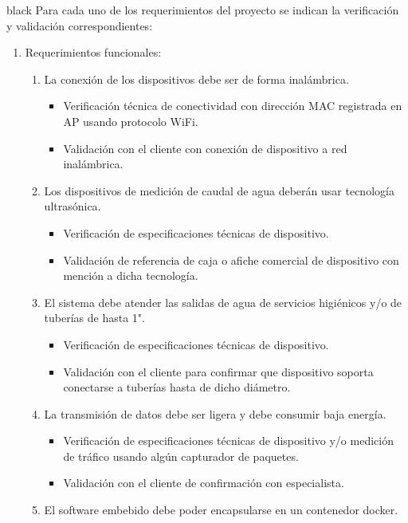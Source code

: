 \documentclass[
11pt, %
codirector, %
]{charter}
\begin{document}
\begin{consigna}{black}
Para cada uno de los requerimientos del proyecto se indican la verificación y validación correspondientes:

\begin{enumerate}
\item Requerimientos funcionales:
	\begin{enumerate}
		\item La conexión de los dispositivos debe ser de forma inalámbrica.
			\begin{itemize}
				\item Verificación técnica de conectividad con dirección MAC registrada en AP usando protocolo WiFi. 
				\item Validación con el cliente con conexión de dispositivo a red inalámbrica.
			\end{itemize}
		\item Los dispositivos de medición de caudal de agua deberán usar tecnología ultrasónica.
			\begin{itemize}
				\item Verificación de especificaciones técnicas de dispositivo. 
				\item Validación de referencia de caja o afiche comercial de dispositivo con mención a dicha tecnología.  
			\end{itemize}
		\item El sistema debe atender las salidas de agua de servicios higiénicos y/o de tuberías de hasta 1".
			\begin{itemize}
				\item Verificación de especificaciones técnicas de dispositivo.  
				\item Validación con el cliente para confirmar que dispositivo soporta conectarse a tuberías hasta de dicho diámetro.
			\end{itemize}
		\item La transmisión de datos debe ser ligera y debe consumir baja energía. 
			\begin{itemize}
				\item Verificación de especificaciones técnicas de dispositivo y/o medición de tráfico usando algún capturador de paquetes. 
				\item Validación con el cliente de confirmación con especialista. 
			\end{itemize}
		\item El software embebido debe poder encapsularse en un contenedor docker.
			\begin{itemize}

\end{itemize}
\end{enumerate}
\end{enumerate}
\end{consigna}
\end{document}
